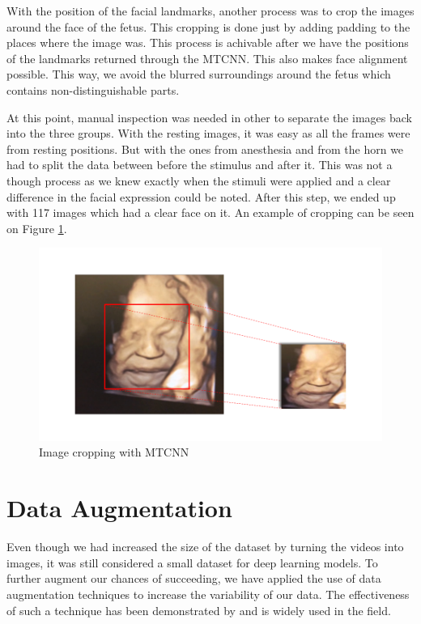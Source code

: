 With the position of the facial landmarks, another process was to crop the images around the face of the fetus. This cropping is done just by adding padding to the places where the image was. This process is achivable after we have the positions of the landmarks returned through the MTCNN. This also makes face alignment possible. This way, we avoid the blurred surroundings around the fetus which contains non-distinguishable parts. 

At this point, manual inspection was needed in other to separate the images back into the three groups. With the resting images, it was easy as all the frames were from resting positions. But with the ones from anesthesia and from the horn we had to split the data between before the stimulus and after it. This was not a though process as we knew exactly when the stimuli were applied and a clear difference in the facial expression could be noted. After this step, we ended up with 117 images which had a clear face on it. An example of cropping can be seen on Figure \ref{fig:cropping}.

\begin{figure}[h!tp]
    \centering
    \includegraphics[width=.9\textwidth]{imgs/chap3_cropping.png}
    \caption{Image cropping with MTCNN}
    \label{fig:cropping}
\end{figure}

\section{Data Augmentation}

Even though we had increased the size of the dataset by turning the videos into images, it was still considered a small dataset for deep learning models. To further augment our chances of succeeding, we have applied the use of data augmentation techniques to increase the variability of our data. The effectiveness of such a technique has been demonstrated by \cite{abs-1712-04621} and is widely used in the field.

